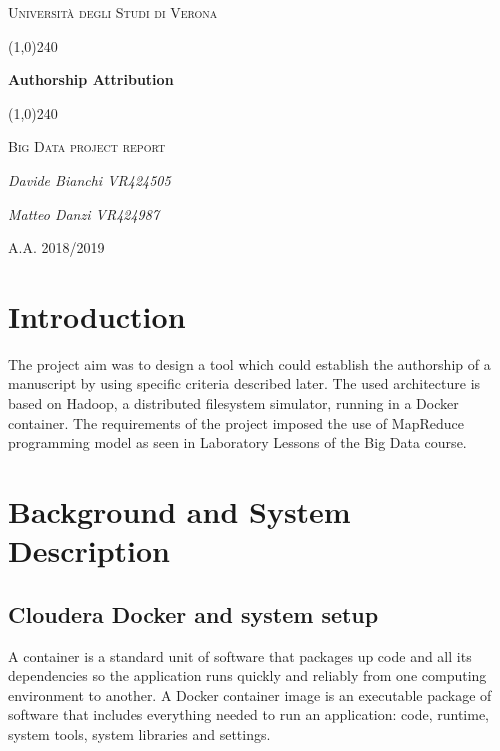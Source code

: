 \documentclass[a4paper,11pt, twoside, openright]{article}
\begin{document}
	\clearpage
	\begin{titlepage}
		\centering
		\vspace*{\fill}
		{\scshape\LARGE Università degli Studi di Verona \par}
		\vspace{1.5cm}
		\line(1,0){240} \\
		{\huge\bfseries Authorship Attribution\par}
		\line(1,0){240} \\
		\vspace{0.5cm}
		{\scshape\Large Big Data project report\par}
		\vspace{2cm}
		{\Large\itshape Davide Bianchi VR424505\par
		\Large\itshape Matteo Danzi VR424987\par}
		\vspace{1cm}
		\vspace{5cm}
		\vspace*{\fill}
		{\large A.A. 2018/2019\par}
	\end{titlepage}
	\thispagestyle{empty}
	\newpage
	\tableofcontents
	\newpage
	
	\section{Introduction}
	The project aim was to design a tool which could establish the authorship of a manuscript by using specific criteria described later. 
	The used architecture is based on Hadoop, a distributed filesystem simulator, running in a Docker container. The requirements of the project imposed the use of MapReduce programming model as seen in Laboratory Lessons of the Big Data course.

	\section{Background and System Description}
    \subsection{Cloudera Docker and system setup}
		A container is a standard unit of software that packages up code and all its dependencies so the application runs quickly and reliably from one computing environment to another. A Docker container image is an executable package of software that includes everything needed to run an application: code, runtime, system tools, system libraries and settings.
\end{document}
